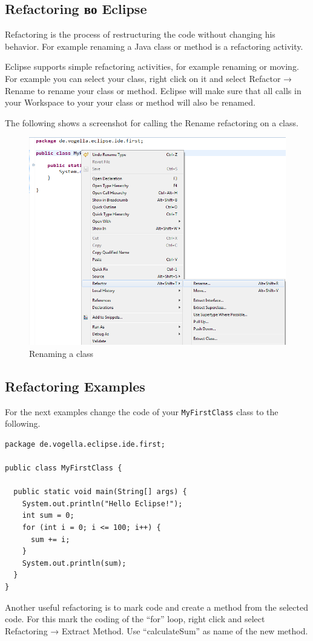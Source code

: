 \subsection{Refactoring во Eclipse}

Refactoring is the process of restructuring the code without changing
his behavior. For example renaming a Java class or method is a
refactoring activity.

Eclipse supports simple refactoring activities, for example renaming or
moving. For example you can select your class, right click on it and
select Refactor → Rename to rename your class or method. Eclipse will
make sure that all calls in your Workspace to your your class or method
will also be renamed.

The following shows a screenshot for calling the Rename refactoring on a
class.

\begin{figure}[htbp]
\centering
\includegraphics[scale=.5]{images/refactor}
\caption{Renaming a class}
\end{figure}

\subsection{Refactoring Examples}

For the next examples change the code of your \texttt{MyFirstClass}
class to the following.

\begin{verbatim}
package de.vogella.eclipse.ide.first;

public class MyFirstClass {

  public static void main(String[] args) {
    System.out.println("Hello Eclipse!");
    int sum = 0;
    for (int i = 0; i <= 100; i++) {
      sum += i;
    }
    System.out.println(sum);
  }
} 
\end{verbatim}
Another useful refactoring is to mark code and create a method from the
selected code. For this mark the coding of the ``for'' loop, right click
and select Refactoring → Extract Method. Use ``calculateSum'' as name of
the new method.

